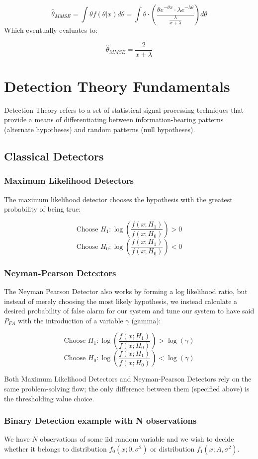 \documentclass[12pt]{article}
\begin{document}
\[\hat{\theta}_{MMSE} =  \int \theta f(\theta | x)d\theta =  \int \theta \cdot \left( \frac{\theta e ^{-\theta x} \cdot  \lambda e^{-\lambda \theta}}{\frac{\lambda}{x+\lambda}} \right) d\theta \]
Which eventually evaluates to:

\[\hat{\theta}_{MMSE}  = \frac{2}{x + \lambda}\]

\section{Detection Theory Fundamentals} 
Detection Theory refers to a set of statistical signal processing techniques that provide a means of differentiating between information-bearing patterns (alternate hypotheses) and random patterns (null hypotheses).
\subsection{Classical Detectors}
\subsubsection{Maximum Likelihood Detectors}
The maximum likelihood detector chooses the hypothesis with the greatest probability of being true:

\[
\text{Choose } H_1: \log \left(\frac{f(x; H_1)}{f(x; H_0)}\right) > 0
\]
\[
\text{Choose } H_0: \log \left(\frac{f(x; H_1)}{f(x; H_0)}\right) < 0
\]

\subsubsection{Neyman-Pearson Detectors}

The Neyman Pearson Detector also works by forming a log likelihood ratio, but instead of merely choosing the most likely hypothesis, we instead calculate a desired probability of false alarm for our system and tune our system to have said \(P_{FA}\) with the introduction of a variable \(\gamma\) (gamma):


\[
\text{Choose } H_1: \log \left(\frac{f(x; H_1)}{f(x; H_0)}\right) > \log(\gamma)
\]
\[
\text{Choose } H_0: \log \left(\frac{f(x; H_1)}{f(x; H_0)}\right) < \log(\gamma)
\]

Both Maximum Likelihood Detectors and Neyman-Pearson Detectors rely on the same problem-solving flow; the only difference between them (specified above) is the thresholding value choice.

\subsubsection{Binary Detection example with N observations}
We have \(N\) observations of some iid random variable and we wish to decide whether it belongs to distribution \(f_0(x; 0, \sigma^2)\) or distribution \(f_1(x; A, \sigma^2)\). \\
\end{document}
